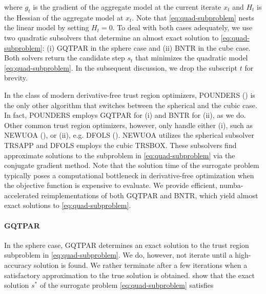 \noindent where $g_t$ is the gradient of the aggregate model at the current iterate $x_t$ and $H_t$ is the Hessian of the aggregate model at $x_t$.
Note that \ref{eq:quad-subproblem} nests the linear model by setting $H_t=0$.
To deal with both cases adequately, we use two quadratic subsolvers that determine an almost exact solution to \ref{eq:quad-subproblem}: (i) GQTPAR in the sphere case and (ii) BNTR in the cube case.
Both solvers return the candidate step $s_t$ that minimizes the quadratic model \ref{eq:quad-subproblem}. In the subsequent discussion, we drop the subscript $t$ for brevity.

\noindent In the class of modern derivative-free trust region optimizers, POUNDERS (\cite{Wild2015}) is the only other algorithm that switches between the spherical and the cubic case. In fact, POUNDERS employs GQTPAR for (i) and BNTR for (ii), as we do. Other common trust region optimizers, however, only handle either (i), such as NEWUOA (\cite{newuoa2006}), or (ii), e.g. DFOLS (\cite{dfols2019}). NEWUOA utilizes the spherical subsolver TRSAPP and DFOLS employs the cubic TRSBOX. These subsolvers find approximate solutions to the subproblem in \ref{eq:quad-subproblem} via the conjugate gradient method.
Note that the solution time of the surrogate problem typically poses a computational bottleneck in derivative-free optimization when the objective function is expensive to evaluate.
We provide efficient, numba-accelerated reimplementations of both GQTPAR and BNTR, which yield almost exact solutions to \ref{eq:quad-subproblem}.



\paragraph{GQTPAR}

In the sphere case, GQTPAR determines an exact solution to the trust region
subproblem in \ref{eq:quad-subproblem}. We do, however, not iterate until a high-accuracy solution is found. We rather terminate after a few iterations when a satisfactory approximation to the true solution is obtained.\cite{More1983} show that the exact solution $s^*$ of the surrogate problem \ref{eq:quad-subproblem} satisfies


